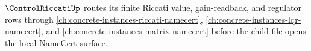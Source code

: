 $\ControlRiccatiUp$ routes its finite Riccati value, gain-readback, and regulator rows through \autoref{ch:concrete-instances-riccati-namecert}, \autoref{ch:concrete-instances-lqr-namecert}, and \autoref{ch:concrete-instances-matrix-namecert} before the child file opens the local NameCert surface.


